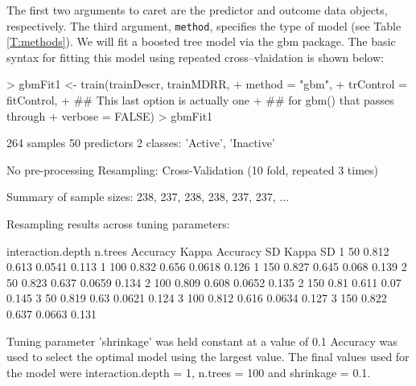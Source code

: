 \documentclass[12pt]{article}
\newcommand{\code}[1]{\mbox{\footnotesize\color{darkblue}\texttt{#1}}}
\newcommand{\pkg}[1]{{\fontseries{b}\selectfont #1}}
\renewcommand{\pkg}[1]{{\textsf{#1}}}
\renewenvironment{Schunk}{\vspace{\topsep}}{\vspace{\topsep}}
\begin{document}
The first two arguments to \pkg{caret} are the predictor and
outcome data objects, respectively. The third argument,
\code{method}, specifies the type of model (see Table 
\ref{T:methods}). We will fit a boosted tree model via the \pkg{gbm}
package. The basic syntax for fitting this model using repeated
cross--vlaidation is shown below:

\begin{small}
\begin{Schunk}
\begin{Sinput}
> gbmFit1 <- train(trainDescr, trainMDRR, 
+                  method = "gbm", 
+                  trControl = fitControl,
+                  ## This last option is actually one
+                  ## for gbm() that passes through
+                  verbose = FALSE)
> gbmFit1
\end{Sinput}
\begin{Soutput}
264 samples
 50 predictors
  2 classes: 'Active', 'Inactive' 

No pre-processing
Resampling: Cross-Validation (10 fold, repeated 3 times) 

Summary of sample sizes: 238, 237, 238, 238, 237, 237, ... 

Resampling results across tuning parameters:

  interaction.depth  n.trees  Accuracy  Kappa  Accuracy SD  Kappa SD
  1                  50       0.812     0.613  0.0541       0.113   
  1                  100      0.832     0.656  0.0618       0.126   
  1                  150      0.827     0.645  0.068        0.139   
  2                  50       0.823     0.637  0.0659       0.134   
  2                  100      0.809     0.608  0.0652       0.135   
  2                  150      0.81      0.611  0.07         0.145   
  3                  50       0.819     0.63   0.0621       0.124   
  3                  100      0.812     0.616  0.0634       0.127   
  3                  150      0.822     0.637  0.0663       0.131   

Tuning parameter 'shrinkage' was held constant at a value of 0.1
Accuracy was used to select the optimal model using  the largest value.
The final values used for the model were interaction.depth = 1, n.trees =
 100 and shrinkage = 0.1. 
\end{Soutput}
\end{Schunk}
\end{small}
\end{document}
